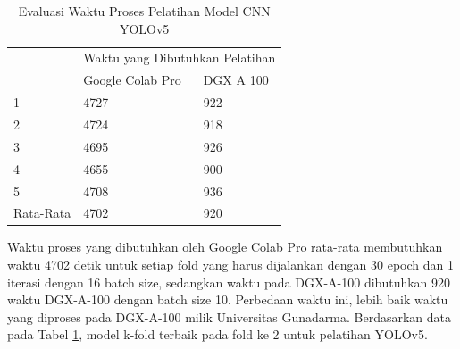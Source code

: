 \begin{singlespace}
	\begin{table}[H]
		\centering
		\caption{Evaluasi Waktu Proses Pelatihan Model CNN YOLOv5}
		\label{tbl:Evaluasi-Waktu-Proses-Pelatihan-Model-CNN-YOLOv5}
		\begin{tabular}{|m{2cm}|m{5cm}m{5cm}|}
			\hline
			\rowcolor[HTML]{D9D9D9} 
			\cellcolor[HTML]{D9D9D9}                       & \multicolumn{2}{l|}{\cellcolor[HTML]{D9D9D9}Waktu yang Dibutuhkan Pelatihan} \\ \cline{2-3} 
			\rowcolor[HTML]{D9D9D9} 
			\multirow{-2}{*}{\cellcolor[HTML]{D9D9D9}Fold} & \multicolumn{1}{l|}{\cellcolor[HTML]{D9D9D9}Google Colab Pro}   & DGX A 100  \\ \hline
			1                                              & \multicolumn{1}{l|}{4727}                                       & 922        \\ \hline
			2                                              & \multicolumn{1}{l|}{4724}                                       & 918        \\ \hline
			3                                              & \multicolumn{1}{l|}{4695}                                       & 926        \\ \hline
			4                                              & \multicolumn{1}{l|}{4655}                                       & 900        \\ \hline
			5                                              & \multicolumn{1}{l|}{4708}                                       & 936        \\ \hline
			Rata-Rata                                      & \multicolumn{1}{l|}{4702}                                       & 920        \\ \hline
		\end{tabular}
	\end{table}
\end{singlespace}

Waktu proses yang dibutuhkan oleh Google Colab Pro rata-rata membutuhkan waktu 4702 detik untuk setiap fold yang harus dijalankan dengan 30 epoch dan 1 iterasi dengan 16 batch size, sedangkan waktu pada DGX-A-100 dibutuhkan 920 waktu DGX-A-100 dengan batch size 10. Perbedaan waktu ini, lebih baik waktu yang diproses pada DGX-A-100 milik Universitas Gunadarma. Berdasarkan data pada Tabel \ref{tbl:Evaluasi-Waktu-Proses-Pelatihan-Model-CNN-YOLOv5}, model k-fold terbaik pada fold ke 2 untuk pelatihan YOLOv5.

